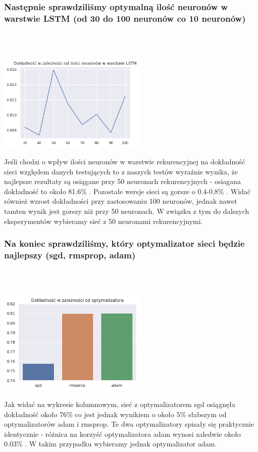 \documentclass[11pt, a4paper, notitlepage]{report}
\begin{document}
\subsubsection{Następnie sprawdziliśmy optymalną ilość neuronów w warstwie LSTM (od 30 do 100 neuronów co 10 neuronów)}
\\ \\
\begin{center}
\includegraphics[width=200pt]{graphics/accuracy_neurons.png}
\end{center}
Jeśli chodzi o wpływ ilości neuronów w warstwie rekurencyjnej na dokładność sieci względem danych testujących to z naszych testów wyraźnie wynika, że najlepsze rezultaty są osiągane przy 50 neuronach rekurencyjnych - osiagana dokładność to około 81.6\% . Pozostałe wersje sieci są gorsze o 0.4-0.8\% .  Widać również wzrost dokładności przy zastosowaniu 100 neuronów, jednak nawet tamten wynik jest gorszy niż przy 50 neuronach. W związku z tym do dalszych eksperymentów wybieramy sieć z 50 neuronami rekurencyjnymi.

\subsubsection{Na koniec sprawdziliśmy, który optymalizator sieci będzie najlepszy (sgd, rmsprop, adam)}
\\ \\
\begin{center}
\includegraphics[width=200pt]{graphics/accuracy_optimizer.png}
\end{center}
Jak widać na wykresie kolumnowym, sieć z optymalizatorem sgd osiągnęła dokładność około 76\% co jest jednak wynikiem o około 5\% słabszym od optymalizatorów adam i rmsprop. Te dwa optymalizatory spisały się praktycznie identycznie - różnica na korzyść optymalizatora adam wynosi zaledwie około 0.03\% . W takim przypadku wybieramy jednak optymalizator adam.
\end{document}
